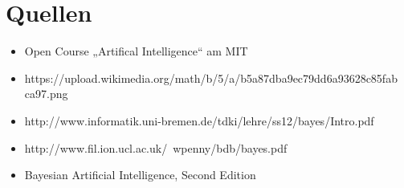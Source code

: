 \section{Quellen}
\begin{itemize}
\item Open Course „Artifical Intelligence“ am MIT
\item https://upload.wikimedia.org/math/b/5/a/b5a87dba9ec79dd6a93628c85fab ca97.png
\item http://www.informatik.uni-bremen.de/tdki/lehre/ss12/bayes/Intro.pdf
\item http://www.fil.ion.ucl.ac.uk/~wpenny/bdb/bayes.pdf
\item Bayesian Artificial Intelligence, Second Edition
\end{itemize}
